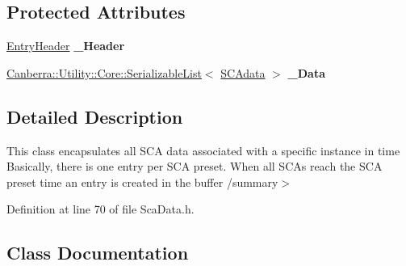 \subsection*{Protected Attributes}
\begin{DoxyCompactItemize}
\item 
\mbox{\label{class_canberra_1_1_data_types_1_1_spectroscopy_1_1_s_c_abuffer_1_1_buffer_entry_a86afb4f8151b7393e9f96c3a0f518676}} 
\hyperlink{class_canberra_1_1_data_types_1_1_spectroscopy_1_1_s_c_abuffer_1_1_buffer_entry_de/d72/struct_canberra_1_1_data_types_1_1_spectroscopy_1_1_s_c_abuffer_1_1_buffer_entry_1_1_entry_header_tag}{Entry\+Header} {\bfseries \+\_\+\+Header}
\item 
\mbox{\label{class_canberra_1_1_data_types_1_1_spectroscopy_1_1_s_c_abuffer_1_1_buffer_entry_a81df3d677ae70aab2ca0666f79bc6d5c}} 
\hyperlink{class_canberra_1_1_utility_1_1_core_1_1_serializable_list}{Canberra\+::\+Utility\+::\+Core\+::\+Serializable\+List}$<$ \hyperlink{class_canberra_1_1_data_types_1_1_spectroscopy_1_1_s_c_abuffer_1_1_buffer_entry_de/dd8/struct_canberra_1_1_data_types_1_1_spectroscopy_1_1_s_c_abuffer_1_1_buffer_entry_1_1_s_c_adata_tag}{S\+C\+Adata} $>$ {\bfseries \+\_\+\+Data}
\end{DoxyCompactItemize}


\subsection{Detailed Description}
This class encapsulates all S\+CA data associated with a specific instance in time Basically, there is one entry per S\+CA preset. When all S\+CA\textquotesingle{}s reach the S\+CA preset time an entry is created in the buffer /summary$>$ 

Definition at line 70 of file Sca\+Data.\+h.



\subsection{Class Documentation}
\label{struct_canberra_1_1_data_types_1_1_spectroscopy_1_1_s_c_abuffer_1_1_buffer_entry_1_1_entry_header_tag}
